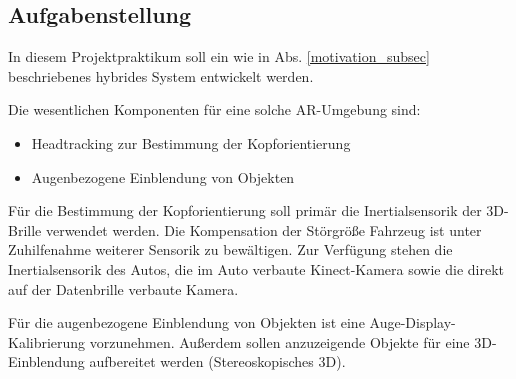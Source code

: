 \subsection{Aufgabenstellung}
\label{aufgabenstellung_subsec}


In diesem Projektpraktikum soll ein wie in Abs. \ref{motivation_subsec} beschriebenes hybrides System entwickelt werden.

Die wesentlichen Komponenten für eine solche AR-Umgebung sind:
\begin{itemize}
  \item Headtracking zur Bestimmung der Kopforientierung
  \item Augenbezogene Einblendung von Objekten
\end{itemize}

Für die Bestimmung der Kopforientierung soll primär die Inertialsensorik der 3D-Brille verwendet werden.
Die Kompensation der Störgröße Fahrzeug ist unter Zuhilfenahme weiterer Sensorik zu bewältigen.
Zur Verfügung stehen die Inertialsensorik des Autos, die im Auto verbaute Kinect-Kamera sowie die direkt auf der Datenbrille verbaute Kamera.

Für die augenbezogene Einblendung von Objekten ist eine Auge-Display-Kalibrierung vorzunehmen.
Außerdem sollen anzuzeigende Objekte für eine 3D-Einblendung aufbereitet werden (Stereoskopisches 3D).

